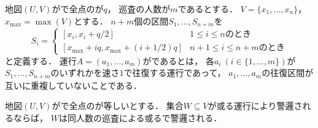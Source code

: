 \begin{defi}
  \label{defi:independentSectionOperation}
  地図$(U, V)$が{\graphLine}で全点の{\maxIdletime}が$q$，
  巡査の人数が$m$であるとする．
  $V = \{ x_1, \ldots, x_n \}$，$x_{\max} = \max(V)$とする．
  $n + m$個の区間$S_1, \ldots, S_{n + m}$を
  \begin{equation}
    \label{equation: candidate segments}
    S_i
    =
    \begin{cases}
      [x_i, x_i + q/2] & \text{$1 \leq i \leq n $のとき} \\
      [x_{\max} + iq, x_{\max} + (i + 1/2)q] & \text{$n + 1 \leq i \leq n + m$のとき}
    \end{cases}
  \end{equation}
  と定義する．
  運行$A = (a_1, \ldots, a_m)$がであるとは，
  各$a_i\ (i \in \{ 1, \ldots, m \})$が
  $S_1, \ldots, S_{n + m}$のいずれかを速さ$1$で往復する運行であって，
  $a_1, \ldots, a_m$の往復区間が互いに重複していないことである．
\end{defi}


\begin{lemm}
  \label{lemm:LineUnaryIdletimeIndependentInterval}
  地図$(U, V)$が{\graphLine}で全点の{\maxIdletime}が等しいとする．
  集合$W \subseteq V$が或る運行により警邏されるならば，
  $W$は同人数の巡査による或る{\sepSectPatroll}で警邏される．
\end{lemm}

